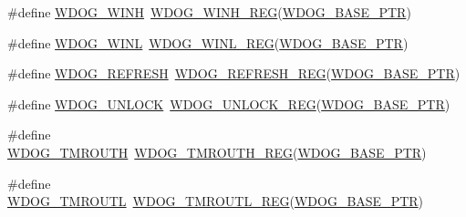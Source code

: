 \begin{DoxyCompactItemize}
\item 
\#define \hyperlink{group___w_d_o_g___register___accessor___macros_gafba071ed7ec77bbc7c4a8523902d73b1}{W\+D\+O\+G\+\_\+\+W\+I\+NH}~\hyperlink{group___w_d_o_g___register___accessor___macros_gacb494604d8f57ea1aa0a6d8c9921b955}{W\+D\+O\+G\+\_\+\+W\+I\+N\+H\+\_\+\+R\+EG}(\hyperlink{group___w_d_o_g___peripheral_ga72fb27c7bc1ae124f180d8f2c7b9fa79}{W\+D\+O\+G\+\_\+\+B\+A\+S\+E\+\_\+\+P\+TR})
\item 
\#define \hyperlink{group___w_d_o_g___register___accessor___macros_gafcfff3b1d3ea71447881afd8b633b29c}{W\+D\+O\+G\+\_\+\+W\+I\+NL}~\hyperlink{group___w_d_o_g___register___accessor___macros_ga7d3de8371302abe17948011dd6ae8522}{W\+D\+O\+G\+\_\+\+W\+I\+N\+L\+\_\+\+R\+EG}(\hyperlink{group___w_d_o_g___peripheral_ga72fb27c7bc1ae124f180d8f2c7b9fa79}{W\+D\+O\+G\+\_\+\+B\+A\+S\+E\+\_\+\+P\+TR})
\item 
\#define \hyperlink{group___w_d_o_g___register___accessor___macros_ga0b4ee41e96710a1c020f3eb2af43f857}{W\+D\+O\+G\+\_\+\+R\+E\+F\+R\+E\+SH}~\hyperlink{group___w_d_o_g___register___accessor___macros_ga706e227590678130bb2b7fc04e0263d1}{W\+D\+O\+G\+\_\+\+R\+E\+F\+R\+E\+S\+H\+\_\+\+R\+EG}(\hyperlink{group___w_d_o_g___peripheral_ga72fb27c7bc1ae124f180d8f2c7b9fa79}{W\+D\+O\+G\+\_\+\+B\+A\+S\+E\+\_\+\+P\+TR})
\item 
\#define \hyperlink{group___w_d_o_g___register___accessor___macros_gaae3cce316f6ec53a8962eae6e10652d4}{W\+D\+O\+G\+\_\+\+U\+N\+L\+O\+CK}~\hyperlink{group___w_d_o_g___register___accessor___macros_ga0424f1f517c5ed49f00c67fc4454bba5}{W\+D\+O\+G\+\_\+\+U\+N\+L\+O\+C\+K\+\_\+\+R\+EG}(\hyperlink{group___w_d_o_g___peripheral_ga72fb27c7bc1ae124f180d8f2c7b9fa79}{W\+D\+O\+G\+\_\+\+B\+A\+S\+E\+\_\+\+P\+TR})
\item 
\#define \hyperlink{group___w_d_o_g___register___accessor___macros_gab4868d043e2cfec8f98cfb8782bd60e6}{W\+D\+O\+G\+\_\+\+T\+M\+R\+O\+U\+TH}~\hyperlink{group___w_d_o_g___register___accessor___macros_ga6c5cca0fc2aeec6d1f8808f55c57acbb}{W\+D\+O\+G\+\_\+\+T\+M\+R\+O\+U\+T\+H\+\_\+\+R\+EG}(\hyperlink{group___w_d_o_g___peripheral_ga72fb27c7bc1ae124f180d8f2c7b9fa79}{W\+D\+O\+G\+\_\+\+B\+A\+S\+E\+\_\+\+P\+TR})
\item 
\#define \hyperlink{group___w_d_o_g___register___accessor___macros_ga37ac1b7e81db9a5b20a502c970d712c2}{W\+D\+O\+G\+\_\+\+T\+M\+R\+O\+U\+TL}~\hyperlink{group___w_d_o_g___register___accessor___macros_gaed1d5071ac9fb7f531fdda660780a329}{W\+D\+O\+G\+\_\+\+T\+M\+R\+O\+U\+T\+L\+\_\+\+R\+EG}(\hyperlink{group___w_d_o_g___peripheral_ga72fb27c7bc1ae124f180d8f2c7b9fa79}{W\+D\+O\+G\+\_\+\+B\+A\+S\+E\+\_\+\+P\+TR})

\end{DoxyCompactItemize}
